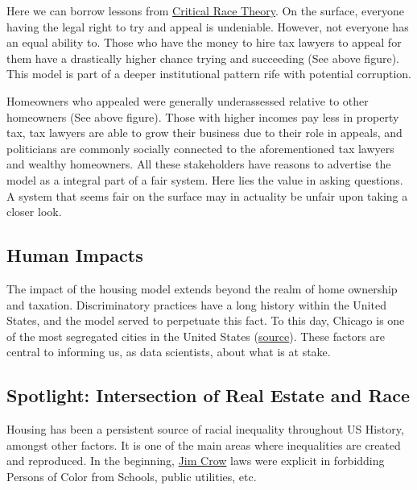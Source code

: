 \documentclass[
  letterpaper,
  DIV=11,
  numbers=noendperiod]{scrreprt}
\begin{document}
Here we can borrow lessons from
\href{https://www.britannica.com/topic/critical-race-theory}{Critical
Race Theory}. On the surface, everyone having the legal right to try and
appeal is undeniable. However, not everyone has an equal ability to.
Those who have the money to hire tax lawyers to appeal for them have a
drastically higher chance trying and succeeding (See above figure). This
model is part of a deeper institutional pattern rife with potential
corruption.

Homeowners who appealed were generally underassessed relative to other
homeowners (See above figure). Those with higher incomes pay less in
property tax, tax lawyers are able to grow their business due to their
role in appeals, and politicians are commonly socially connected to the
aforementioned tax lawyers and wealthy homeowners. All these
stakeholders have reasons to advertise the model as a integral part of a
fair system. Here lies the value in asking questions. A system that
seems fair on the surface may in actuality be unfair upon taking a
closer look.

\hypertarget{human-impacts}{%
\subsection{Human Impacts}\label{human-impacts}}

The impact of the housing model extends beyond the realm of home
ownership and taxation. Discriminatory practices have a long history
within the United States, and the model served to perpetuate this fact.
To this day, Chicago is one of the most segregated cities in the United
States
(\href{https://fivethirtyeight.com/features/the-most-diverse-cities-are-often-the-most-segregated/}{source}).
These factors are central to informing us, as data scientists, about
what is at stake.

\hypertarget{spotlight-intersection-of-real-estate-and-race}{%
\subsection{Spotlight: Intersection of Real Estate and
Race}\label{spotlight-intersection-of-real-estate-and-race}}

Housing has been a persistent source of racial inequality throughout US
History, amongst other factors. It is one of the main areas where
inequalities are created and reproduced. In the beginning,
\href{https://www.history.com/topics/early-20th-century-us/jim-crow-laws}{Jim
Crow} laws were explicit in forbidding Persons of Color from Schools,
public utilities, etc.
\end{document}
